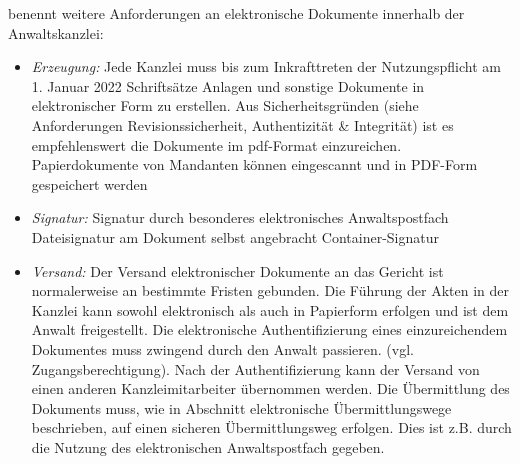 \citeauthor{rechtsvekehranwaltskanzlei} benennt weitere Anforderungen an elektronische Dokumente innerhalb der Anwaltskanzlei:
\begin{itemize}
\item \textit{Erzeugung:}
Jede Kanzlei muss bis zum Inkrafttreten der Nutzungspflicht am 1. Januar 2022 Schriftsätze Anlagen und sonstige Dokumente in elektronischer Form zu erstellen. Aus Sicherheitsgründen (siehe Anforderungen Revisionssicherheit, Authentizität \& Integrität) ist es empfehlenswert die Dokumente im pdf-Format einzureichen.  Papierdokumente von Mandanten können eingescannt und in PDF-Form gespeichert werden
\item \textit{Signatur:}
Signatur durch besonderes elektronisches Anwaltspostfach
Dateisignatur am Dokument selbst angebracht
Container-Signatur
\item \textit{Versand:}
Der Versand elektronischer Dokumente an das Gericht ist normalerweise an bestimmte Fristen gebunden.
Die Führung der Akten in der Kanzlei kann sowohl elektronisch als auch in Papierform erfolgen und ist dem Anwalt freigestellt. Die elektronische Authentifizierung eines einzureichendem Dokumentes muss zwingend durch den Anwalt passieren. (vgl. Zugangsberechtigung). Nach der Authentifizierung kann der Versand von einen anderen Kanzleimitarbeiter übernommen werden. Die Übermittlung des Dokuments muss, wie in Abschnitt elektronische Übermittlungswege beschrieben, auf einen sicheren Übermittlungsweg erfolgen. Dies ist z.B. durch die Nutzung des elektronischen Anwaltspostfach gegeben.
\end{itemize}
	  

